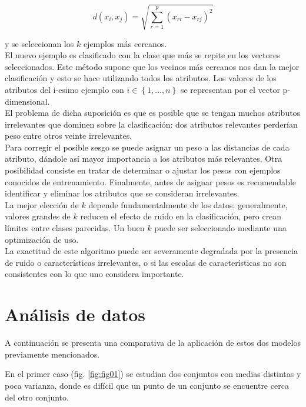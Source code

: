 \documentclass[11pt,letterpaper,reqno]{article}
\begin{document}
$$
d(x_i,x_j)=\sqrt{\sum_{r=1}^{p} (x_{ri}-x_{rj})^2} 
$$

y se seleccionan los $ k $ ejemplos más cercanos.\\

El nuevo ejemplo es clasificado con la clase que más se repite en los vectores seleccionados. Este método supone que los vecinos más cercanos nos dan la mejor clasificación y esto se hace utilizando todos los atributos. Los valores de los atributos del i-esimo ejemplo con $ i \in \left\lbrace 1, \ldots , n \right\rbrace $ se representan por el vector p-dimensional.\\

El problema de dicha suposición es que es posible que se tengan muchos atributos irrelevantes que dominen sobre la clasificación: dos atributos relevantes perderían peso entre otros veinte irrelevantes.\\

Para corregir el posible sesgo se puede asignar un peso a las distancias de cada atributo, dándole así mayor importancia a los atributos más relevantes. Otra posibilidad consiste en tratar de determinar o ajustar los pesos con ejemplos conocidos de entrenamiento. Finalmente, antes de asignar pesos es recomendable identificar y eliminar los atributos que se consideran irrelevantes.\\

La mejor elección de $ k $ depende fundamentalmente de los datos; generalmente, valores grandes de $ k $ reducen el efecto de ruido en la clasificación, pero crean límites entre clases parecidas. Un buen $ k $ puede ser seleccionado mediante una optimización de uso.\\

La exactitud de este algoritmo puede ser severamente degradada por la presencia de ruido o características irrelevantes, o si las escalas de características no son consistentes con lo que uno considera importante.

\section{Análisis de datos}

A continuación se presenta una comparativa de la aplicación de estos dos modelos previamente mencionados.

En el primer caso (fig. \ref{fig:fig01}) se estudian dos conjuntos con medias distintas y poca varianza, donde es difícil que un punto de un conjunto se encuentre cerca del otro conjunto.
\end{document}
